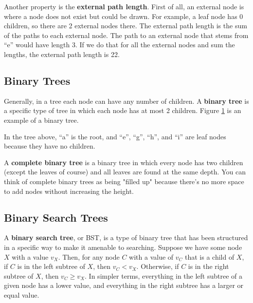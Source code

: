 Another property is the \textbf{external path length}. First of all, an external node is where a node does not exist but could be drawn. For example, a leaf node has 0 children, so there are 2 external nodes there. The external path length is the sum of the paths to each external node. The path to an external node that stems from “e” would have length 3. If we do that for all the external nodes and sum the lengths, the external path length is 22. 


\subsection{Binary Trees}
Generally, in a tree each node can have any number of children. A \textbf{binary tree} is a specific type of tree in which each node has at most 2 children. Figure \ref{fig:tree1} is an example of a binary tree. 

\begin{figure}[h]
\centering
{}
\label{fig:tree1}
\end{figure}

In the tree above, “a” is the root, and “e”, “g”, “h”, and “i” are leaf nodes because they have no children. 

A \textbf{complete binary tree} is a binary tree in which every node has two children (except the leaves of course) and all leaves are found at the same depth. You can think of complete binary trees as being "filled up" because there's no more space to add nodes without increasing the height.



\subsection{Binary Search Trees}

A \textbf{binary search tree}, or BST, is a type of binary tree that has been structured in a specific way to make it amenable to searching. Suppose we have some node $X$ with a value $v_X$. Then, for any node $C$ with a value of $v_C$ that is a child of $X$, if $C$ is in the left subtree of $X$, then $v_C < v_X$. Otherwise, if $C$ is in the right subtree of $X$, then $v_C \geq v_X$. In simpler terms, everything in the left subtree of a given node has a lower value, and everything in the right subtree has a larger or equal value.


